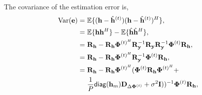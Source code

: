 \documentclass[journal]{IEEEtran}
\newcommand{\diag}{{\sf diag}} %
\begin{document}
The covariance of the estimation error is,
\begin{equation}
\begin{split}
\text{Var}(\mathbf e) = \hspace{0.3em}& \mathbb{E}\{ (\mathbf h - \hat{\mathbf h}^{(t)})(\mathbf h - \hat{\mathbf h}^{(t)})^H \}, \\
=\hspace{0.3em}& \mathbb{E}\{\mathbf h \mathbf h^H\} - \mathbb{E}\{\hat{\mathbf h}\hat{\mathbf h}^H\}, \\
=\hspace{0.3em}& \mathbf R_{\mathbf h} - \mathbf R_{\mathbf h}\bm\Phi^{(t)^H}\mathbf R_{\mathbf y}^{-1}\mathbf R_{\mathbf y}\mathbf R_{\mathbf y}^{-1}\bm\Phi^{(t)}\mathbf R_{\mathbf h}, \\
=\hspace{0.3em}& \mathbf R_{\mathbf h} - \mathbf R_{\mathbf h}\bm\Phi^{(t)^H}\mathbf R_{\mathbf y}^{-1}\bm\Phi^{(t)}\mathbf R_{\mathbf h}, \\
=\hspace{0.3em}& \mathbf R_{\mathbf h} - \mathbf R_{\mathbf h}\bm\Phi^{(t)^H} (\mathbf \Phi^{(t)} \mathbf R_{\mathbf h} \mathbf\Phi^{(t)^{H}} + \\
\hspace{0.3em}& \frac{1}{P} \diag(\mathbf h_m) \mathbf D_{\Delta \bm\Phi^{(t)}} +\sigma^2\mathbf I))^{-1} \bm\Phi^{(t)}\mathbf R_{\mathbf h}, \\
\end{split}
\end{equation}




{\renewcommand{\baselinestretch}{1.1}
\begin{footnotesize}


\end{footnotesize}}
\end{document}
